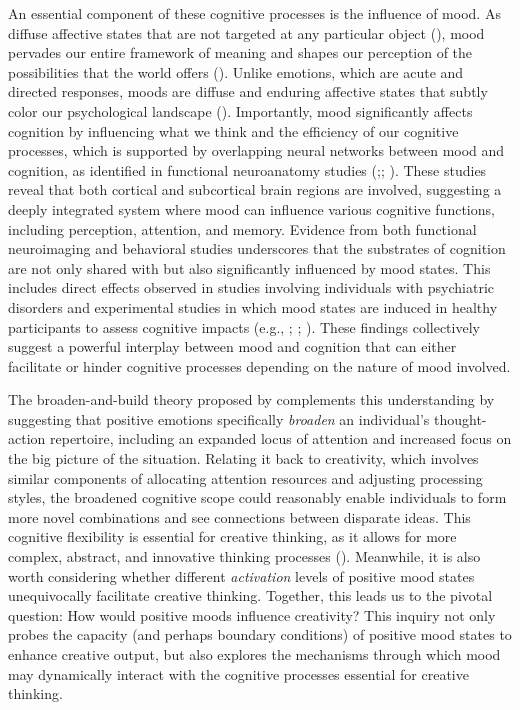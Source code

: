 \documentclass[../MA_Thesis.tex]{subfiles}
\begin{document}
An essential component of these cognitive processes is the influence of mood. As diffuse affective states that are not targeted at any particular object (\cite{desmet_15_2008}), mood pervades our entire framework of meaning and shapes our perception of the possibilities that the world offers (\cite{ratcliffe_why_2013}). Unlike emotions, which are acute and directed responses, moods are diffuse and enduring affective states that subtly color our psychological landscape (\cite{lischetzke_mood_2022}). Importantly, mood significantly affects cognition by influencing what we think and the efficiency of our cognitive processes, which is supported by overlapping neural networks between mood and cognition, as identified in functional neuroanatomy studies (\cite{chepenik_influence_2007};\cite{dolcos_neural_2011}; \cite{storbeck_interdependence_2007}). These studies reveal that both cortical and subcortical brain regions are involved, suggesting a deeply integrated system where mood can influence various cognitive functions, including perception, attention, and memory. Evidence from both functional neuroimaging and behavioral studies underscores that the substrates of cognition are not only shared with but also significantly influenced by mood states. This includes direct effects observed in studies involving individuals with psychiatric disorders and experimental studies in which mood states are induced in healthy participants to assess cognitive impacts (e.g., \cite{cabeza_imaging_2000}; \cite{iosifescu_relation_2012}; \cite{phan_functional_2004}). These findings collectively suggest a powerful interplay between mood and cognition that can either facilitate or hinder cognitive processes depending on the nature of mood involved. 

The broaden-and-build theory proposed by \textcite{fredrickson_role_2001} complements this understanding by suggesting that positive emotions specifically \textit{broaden} an individual's thought-action repertoire, including an expanded locus of attention and increased focus on the big picture of the situation. Relating it back to creativity, which involves similar components of allocating attention resources and adjusting processing styles, the broadened cognitive scope could reasonably enable individuals to form more novel combinations and see connections between disparate ideas. This cognitive flexibility is essential for creative thinking, as it allows for more complex, abstract, and innovative thinking processes (\cite{isen_positive_1987}). Meanwhile, it is also worth considering whether different \textit{activation} levels of positive mood states unequivocally facilitate creative thinking. Together, this leads us to the pivotal question: How would positive moods influence creativity? This inquiry not only probes the capacity (and perhaps boundary conditions) of positive mood states to enhance creative output, but also explores the mechanisms through which mood may dynamically interact with the cognitive processes essential for creative thinking.
\end{document}
